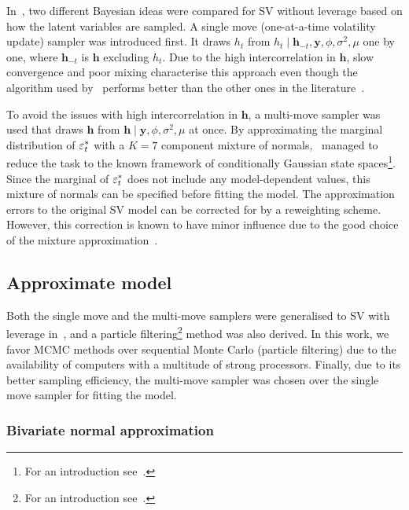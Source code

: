 In~\citet{Kim1998}, two different Bayesian ideas were compared for SV without leverage based on how the latent variables are sampled.
A single move (one-at-a-time volatility update) sampler was introduced first. It draws $h_t$ from $h_t\mid\bm{h}_{-t},\bm{y},\phi,\sigma^2,\mu$ one by one, where $\bm{h}_{-t}$ is $\bm{h}$ excluding $h_t$.
Due to the high intercorrelation in $\bm{h}$, slow convergence and poor mixing characterise this approach even though the algorithm used by~\citet{Kim1998} performs better than the other ones in the literature~\citep{shephard1993fitting,jacquier2002bayesian,shephard1994comment,shephard1997likelihood,geweke1994bayesian}.

To avoid the issues with high intercorrelation in $\bm{h}$, a multi-move sampler was used that draws $\bm{h}$ from $\bm{h}\mid\bm{y},\phi,\sigma^2,\mu$ at once.
By approximating the marginal distribution of $\varepsilon_t^\ast$ with a $K=7$ component mixture of normals,~\citet{Kim1998} managed to reduce the task to the known framework of conditionally Gaussian state spaces\footnote{For an introduction see~\citet{Kitagawa1996}.}.
Since the marginal of $\varepsilon_t^\ast$ does not include any model-dependent values, this mixture of normals can be specified before fitting the model.
The approximation errors to the original SV model can be corrected for by a reweighting scheme.
However, this correction is known to have minor influence due to the good choice of the mixture approximation~\citep{Kim1998}.

\subsection{Approximate model}

Both the single move and the multi-move samplers were generalised to SV with leverage in~\citet{Omori2007}, and a particle filtering\footnote{For an introduction see~\citet{Johannes2009}.} method was also derived.
In this work, we favor MCMC methods over sequential Monte Carlo (particle filtering) due to the availability of computers with a multitude of strong processors.
Finally, due to its better sampling efficiency, the multi-move sampler was chosen over the single move sampler for fitting the model.

\subsubsection{Bivariate normal approximation}

